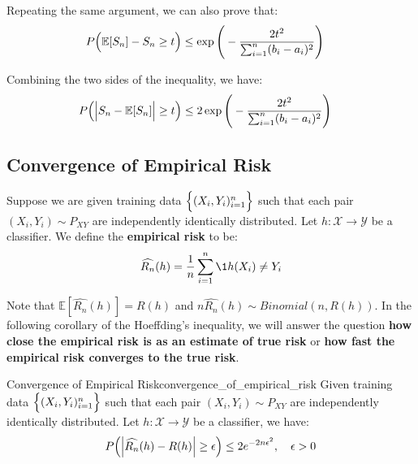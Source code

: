 \begin{proof*}
    \noindent Repeating the same argument, we can also prove that:
    \begin{align*}
        P\Big( \mathbb{E}[S_n] - S_n \ge t \Big) &\le \exp\Bigg( 
            -\frac{2t^2}{\sum_{i=1}^n(b_i - a_i)^2}
         \Bigg)
    \end{align*}

    \noindent Combining the two sides of the inequality, we have:
    \begin{align*}
        P\Big( \Big| S_n - \mathbb{E}[S_n] \Big| \ge t \Big) &\le 2\exp\Bigg( 
            -\frac{2t^2}{\sum_{i=1}^n(b_i - a_i)^2}
         \Bigg)
    \end{align*}
\end{proof*}


\subsection{Convergence of Empirical Risk}
\begin{definition}
    Suppose we are given training data $\Big\{ (X_i, Y_i)_{i=1}^n \Big\}$ such that each pair $(X_i, Y_i)\sim P_{XY}$ are independently identically distributed. Let $h:\mathcal{X}\to\mathcal{Y}$ be a classifier. We define the \textbf{empirical risk} to be:
    \begin{align*}
        \widehat{R_n}(h) = \frac{1}{n}\sum_{i=1}^n \1{h(X_i) \ne Y_i}
    \end{align*}

    \noindent Note that $\mathbb{E}[\widehat{R_n}(h)] = R(h)$ and $n\widehat{R_n}(h) \sim Binomial(n, R(h))$. In the following corollary of the Hoeffding's inequality, we will answer the question \textbf{how close the empirical risk is as an estimate of true risk} or \textbf{how fast the empirical risk converges to the true risk}.
\end{definition}

\begin{corollary}{Convergence of Empirical Risk}{convergence_of_empirical_risk}
    Given training data $\Big\{ (X_i, Y_i)_{i=1}^n \Big\}$ such that each pair $(X_i, Y_i)\sim P_{XY}$ are independently identically distributed. Let $h:\mathcal{X}\to\mathcal{Y}$ be a classifier, we have:
    \begin{align*}
        P\Big( 
            \Big| \widehat{R_n}(h) - R(h) \Big| \ge \epsilon
         \Big) \le 2e^{-2n\epsilon^2}, \ \ \ \epsilon > 0
    \end{align*}
\end{corollary}

